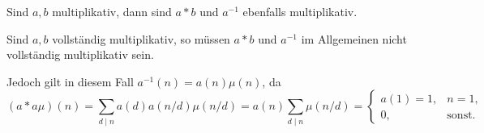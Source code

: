 \begin{theorem}
    Sind $a, b$ multiplikativ, dann sind $a \ast b$ und $a^{-1}$ ebenfalls multiplikativ.
\end{theorem}

\begin{remark}
    Sind $a, b$ vollständig multiplikativ, so müssen $a \ast b$ und $a^{-1}$ im Allgemeinen nicht vollständig multiplikativ sein.
    
    Jedoch gilt in diesem Fall $a^{-1}(n) = a(n) \mu(n)$, da
    $$ (a \ast a \mu)(n) = \sum_{d \mid n} a(d) a(n/d) \mu(n/d) = a(n) \sum_{d \mid n} \mu(n/d) = \left\{ \begin{array}{ll} a(1) = 1, & n=1, \\ 0, & \textrm{sonst}. \end{array} \right. $$
\end{remark}